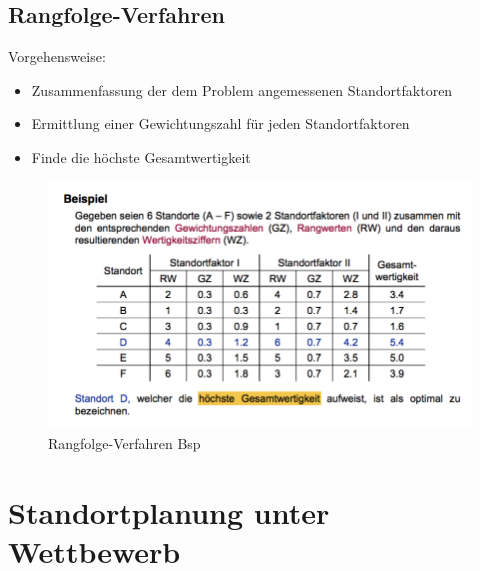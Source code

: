 
    \subsection{Rangfolge-Verfahren} %
    \label{sub:rangfolge_verfahren}

      \par Vorgehensweise:

      \begin{itemize}
        \item Zusammenfassung der dem Problem angemessenen Standortfaktoren
        \item Ermittlung einer Gewichtungszahl für jeden Standortfaktoren
        \item Finde die höchste Gesamtwertigkeit
      \end{itemize}

      \begin{exmp}
        
      \end{exmp}

      \begin{figure}[H]
        \centering
        \includegraphics[width=\textwidth]{Images/Rangfolgen_Verfahren_BSP.png}
        \caption{Rangfolge-Verfahren Bsp}
      \end{figure}

    


  \section{Standortplanung unter Wettbewerb} %
  \label{sec:standortplanung_unter_wettbewerb}

